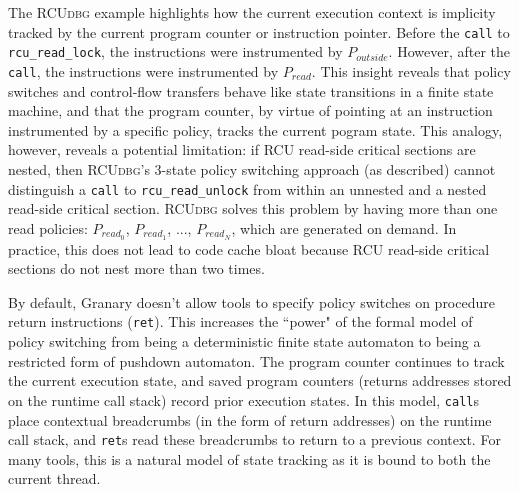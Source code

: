 \documentclass[preprint]{sigplanconf}
\newcommand{\toolname}[1]{{\scshape #1}}
\begin{document}

The \toolname{RCUdbg} example highlights how the current execution context is implicity tracked by the current program counter or instruction pointer. Before the \texttt{call} to \texttt{rcu\_\linebreak[0]read\_\linebreak[0]lock}, the instructions were instrumented by $P_{outside}$. However, after the \texttt{call}, the instructions were instrumented by $P_{read}$. This insight reveals that policy switches and control-flow transfers behave like state transitions in a finite state machine, and that the program counter, by virtue of pointing at an instruction instrumented by a specific policy, tracks the current pogram state. This analogy, however, reveals a potential limitation: if RCU read-side critical sections are nested, then \toolname{RCUdbg}'s 3-state policy switching approach (as described) cannot distinguish a \texttt{call} to \texttt{rcu\_\linebreak[0]read\_\linebreak[0]unlock} from within an unnested and a nested read-side critical section. \toolname{RCUdbg} solves this problem by having more than one read policies: $P_{\mathit{{read}_0}}$, $P_{\mathit{{read}_1}}$, ..., $P_{\mathit{{read}_N}}$, which are generated on demand. In practice, this does not lead to code cache bloat because RCU read-side critical sections do not nest more than two times.

By default, Granary doesn't allow tools to specify policy switches on procedure return instructions (\texttt{ret}). This increases the ``power" of the formal model of policy switching from being a deterministic finite state automaton to being a restricted form of pushdown automaton. The program counter continues to track the current execution state, and saved program counters (returns addresses stored on the runtime call stack) record prior execution states. In this model, \texttt{call}s place contextual breadcrumbs (in the form of return addresses) on the runtime call stack, and \texttt{ret}s read these breadcrumbs to return to a previous context. For many tools, this is a natural model of state tracking as it is bound to both the current thread.
\end{document}
